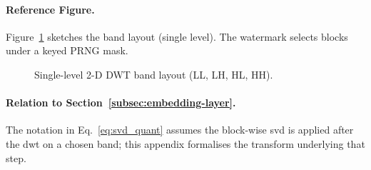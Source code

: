 \paragraph{Reference Figure.} Figure~\ref{fig:dwt_layout_ref} sketches the band
layout (single level). The watermark selects blocks under a keyed PRNG mask.

\begin{figure}[ht]
  \centering
  
  \caption{Single-level 2-D DWT band layout (LL, LH, HL, HH).}
  \label{fig:dwt_layout_ref}
\end{figure}

\paragraph{Relation to Section~\ref{subsec:embedding-layer}.} The notation in
Eq.~\eqref{eq:svd_quant} assumes the block-wise \gls{svd} is applied after the \gls{dwt} on
a chosen band; this appendix formalises the transform underlying that step.
